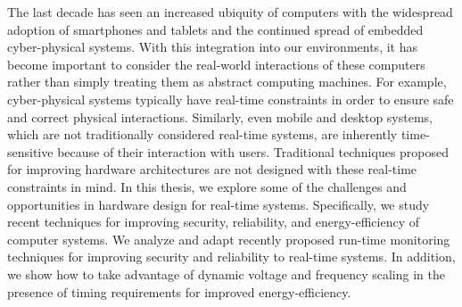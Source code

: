 The last decade has seen an increased ubiquity of computers with the widespread
adoption of smartphones and tablets and the continued spread of embedded
cyber-physical systems. With this integration into our environments, it has
become important to consider the real-world interactions of these computers
rather than simply treating them as abstract computing machines. For example,
cyber-physical systems typically have real-time constraints in order to ensure
safe and correct physical interactions. Similarly, even mobile and desktop
systems, which are not traditionally considered real-time systems, are
inherently time-sensitive because of their interaction with users.  Traditional
techniques proposed for improving hardware architectures are not designed with
these real-time constraints in mind. In this thesis, we explore some of the
challenges and opportunities in hardware design for real-time systems.
Specifically, we study recent techniques for improving security, reliability,
and energy-efficiency of computer systems. We analyze and adapt recently
proposed run-time monitoring techniques for improving security and reliability
to real-time systems. In addition, we show how to take advantage of dynamic
voltage and frequency scaling in the presence of timing requirements for
improved energy-efficiency.

